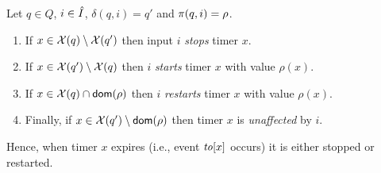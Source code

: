 Let $q \in Q$, $i \in \hat{I}$, $\delta(q,i)=q'$ and $\pi(q,i)=\rho$.
\begin{enumerate}
\item
If $x \in\mathcal{X}(q) \setminus \mathcal{X}(q')$ then input $i$ \emph{stops} timer $x$.
\item
If $x \in \mathcal{X}(q') \setminus \mathcal{X}(q)$ then $i$ \emph{starts} timer $x$ with value $\rho(x)$.
\item
If $x \in \mathcal{X}(q) \cap {\textsf{dom}}(\rho)$ then $i$ \emph{restarts} timer $x$ with value $\rho(x)$.
\item
Finally, if $x \in \mathcal{X}(q') \setminus {\textsf{dom}}(\rho)$ then timer $x$ is \emph{unaffected} by $i$.
\end{enumerate}
Hence, when timer $x$ expires (i.e., event $\mathit{to}[x]$ occurs) it is either stopped or restarted.

